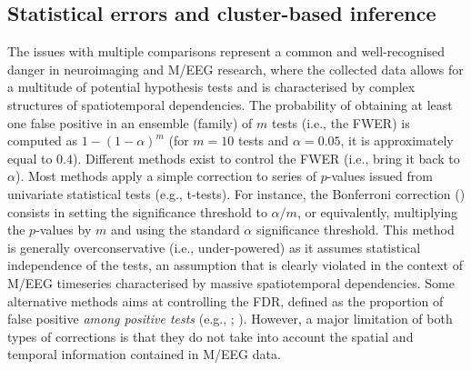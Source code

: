 \documentclass[
  doc,
  floatsintext,
  longtable,
  a4paper,
  nolmodern,
  notxfonts,
  notimes,
  donotrepeattitle,
  colorlinks=true,linkcolor=blue,citecolor=blue,urlcolor=blue]{apa7}
\begin{document}
\subsection{Statistical errors and cluster-based
inference}\label{statistical-errors-and-cluster-based-inference}

The issues with multiple comparisons represent a common and
well-recognised danger in neuroimaging and M/EEG research, where the
collected data allows for a multitude of potential hypothesis tests and
is characterised by complex structures of spatiotemporal dependencies.
The probability of obtaining at least one false positive in an ensemble
(family) of \(m\) tests (i.e., the FWER) is computed as
\(1-\left(1-\alpha\right)^{m}\) (for \(m=10\) tests and \(\alpha=0.05\),
it is approximately equal to \(0.4\)). Different methods exist to
control the FWER (i.e., bring it back to \(\alpha\)). Most methods apply
a simple correction to series of \(p\)-values issued from univariate
statistical tests (e.g., t-tests). For instance, the Bonferroni
correction () consists in setting the
significance threshold to \(\alpha/m\), or equivalently, multiplying the
\(p\)-values by \(m\) and using the standard \(\alpha\) significance
threshold. This method is generally overconservative (i.e.,
under-powered) as it assumes statistical independence of the tests, an
assumption that is clearly violated in the context of M/EEG timeseries
characterised by massive spatiotemporal dependencies. Some alternative
methods aims at controlling the FDR, defined as the proportion of false
positive \emph{among positive tests} (e.g.,
;
). However, a
major limitation of both types of corrections is that they do not take
into account the spatial and temporal information contained in M/EEG
data.
\end{document}
